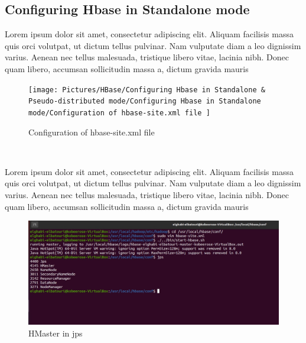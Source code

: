 \begin{spacing}{1.2}
\section{Configuring Hbase in Standalone mode }
\par Lorem ipsum dolor sit amet, consectetur adipiscing elit. Aliquam facilisis massa quis orci volutpat, ut dictum tellus pulvinar. Nam vulputate diam a leo dignissim varius. Aenean nec tellus malesuada, tristique libero vitae, lacinia nibh. Donec quam libero, accumsan sollicitudin massa a, dictum gravida mauris
\\
\begin{figure}[!htb] 
\begin{center} 
\texttt{[image: Pictures/HBase/Configuring Hbase in Standalone \& Pseudo-distributed mode/Configuring Hbase in Standalone mode/Configuration of hbase-site.xml file ]} 
\end{center} 
\caption{Configuration of hbase-site.xml file } 
\end{figure}  \FloatBarrier
\\

\par Lorem ipsum dolor sit amet, consectetur adipiscing elit. Aliquam facilisis massa quis orci volutpat, ut dictum tellus pulvinar. Nam vulputate diam a leo dignissim varius. Aenean nec tellus malesuada, tristique libero vitae, lacinia nibh. Donec quam libero, accumsan sollicitudin massa a, dictum gravida mauris
\\
\begin{figure}[!htb] 
\begin{center} 
\includegraphics[width=1\linewidth]{Pictures/HBase/Configuring Hbase in Standalone & Pseudo-distributed mode/Configuring Hbase in Standalone mode/HMaster in jps} 
\end{center} 
\caption{HMaster in jps} 
\end{figure}  \FloatBarrier
\\


\end{spacing}
